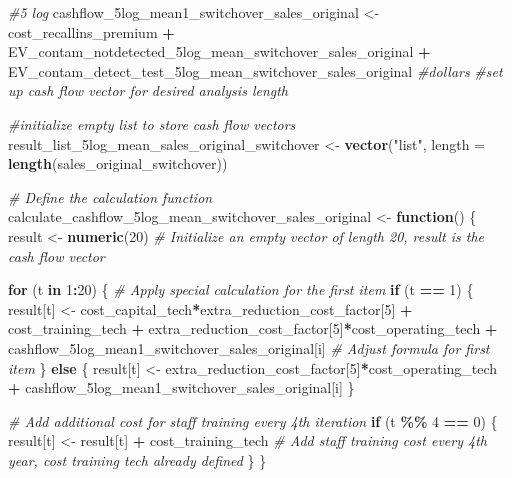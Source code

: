 \documentclass[
]{article}
\newenvironment{Shaded}{\begin{snugshade}}{\end{snugshade}}
\newcommand{\AttributeTok}[1]{\textcolor[rgb]{0.13,0.29,0.53}{#1}}
\newcommand{\CommentTok}[1]{\textcolor[rgb]{0.56,0.35,0.01}{\textit{#1}}}
\newcommand{\ControlFlowTok}[1]{\textcolor[rgb]{0.13,0.29,0.53}{\textbf{#1}}}
\newcommand{\DecValTok}[1]{\textcolor[rgb]{0.00,0.00,0.81}{#1}}
\newcommand{\FunctionTok}[1]{\textcolor[rgb]{0.13,0.29,0.53}{\textbf{#1}}}
\newcommand{\NormalTok}[1]{#1}
\newcommand{\OtherTok}[1]{\textcolor[rgb]{0.56,0.35,0.01}{#1}}
\newcommand{\SpecialCharTok}[1]{\textcolor[rgb]{0.81,0.36,0.00}{\textbf{#1}}}
\newcommand{\StringTok}[1]{\textcolor[rgb]{0.31,0.60,0.02}{#1}}
\begin{document}
\begin{Shaded}
\begin{Highlighting}[]
\CommentTok{\#5 log}
\NormalTok{cashflow\_5log\_mean1\_switchover\_sales\_original }\OtherTok{\textless{}{-}}\NormalTok{ cost\_recallins\_premium }\SpecialCharTok{+}\NormalTok{ EV\_contam\_notdetected\_5log\_mean\_switchover\_sales\_original }\SpecialCharTok{+}\NormalTok{ EV\_contam\_detect\_test\_5log\_mean\_switchover\_sales\_original }\CommentTok{\#dollars}
\CommentTok{\#set up cash flow vector for desired analysis length}

\CommentTok{\#initialize empty list to store cash flow vectors}
\NormalTok{result\_list\_5log\_mean\_sales\_original\_switchover }\OtherTok{\textless{}{-}} \FunctionTok{vector}\NormalTok{(}\StringTok{"list"}\NormalTok{, }\AttributeTok{length =} \FunctionTok{length}\NormalTok{(sales\_original\_switchover))}


\CommentTok{\# Define the calculation function}
\NormalTok{calculate\_cashflow\_5log\_mean\_switchover\_sales\_original }\OtherTok{\textless{}{-}} \ControlFlowTok{function}\NormalTok{() \{}
\NormalTok{  result }\OtherTok{\textless{}{-}} \FunctionTok{numeric}\NormalTok{(}\DecValTok{20}\NormalTok{)  }\CommentTok{\# Initialize an empty vector of length 20, result is the cash flow vector}
  
  \ControlFlowTok{for}\NormalTok{ (t }\ControlFlowTok{in} \DecValTok{1}\SpecialCharTok{:}\DecValTok{20}\NormalTok{) \{}
    \CommentTok{\# Apply special calculation for the first item}
    \ControlFlowTok{if}\NormalTok{ (t }\SpecialCharTok{==} \DecValTok{1}\NormalTok{) \{}
\NormalTok{      result[t] }\OtherTok{\textless{}{-}}\NormalTok{ cost\_capital\_tech}\SpecialCharTok{*}\NormalTok{extra\_reduction\_cost\_factor[}\DecValTok{5}\NormalTok{] }\SpecialCharTok{+}\NormalTok{ cost\_training\_tech }\SpecialCharTok{+}\NormalTok{ extra\_reduction\_cost\_factor[}\DecValTok{5}\NormalTok{]}\SpecialCharTok{*}\NormalTok{cost\_operating\_tech }\SpecialCharTok{+}\NormalTok{ cashflow\_5log\_mean1\_switchover\_sales\_original[i] }\CommentTok{\# Adjust formula for first item}
\NormalTok{    \} }\ControlFlowTok{else}\NormalTok{ \{}
\NormalTok{      result[t] }\OtherTok{\textless{}{-}}\NormalTok{ extra\_reduction\_cost\_factor[}\DecValTok{5}\NormalTok{]}\SpecialCharTok{*}\NormalTok{cost\_operating\_tech }\SpecialCharTok{+}\NormalTok{ cashflow\_5log\_mean1\_switchover\_sales\_original[i]}
\NormalTok{    \}}
    
    \CommentTok{\# Add additional cost for staff training every 4th iteration}
    \ControlFlowTok{if}\NormalTok{ (t }\SpecialCharTok{\%\%} \DecValTok{4} \SpecialCharTok{==} \DecValTok{0}\NormalTok{) \{}
\NormalTok{      result[t] }\OtherTok{\textless{}{-}}\NormalTok{ result[t] }\SpecialCharTok{+}\NormalTok{ cost\_training\_tech  }\CommentTok{\# Add staff training cost every 4th year, cost training tech already defined}
\NormalTok{    \}}
\NormalTok{  \}}
  

\end{Highlighting}
\end{Shaded}
\end{document}
